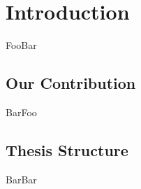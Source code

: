 
\chapter{Introduction}\label{c:introduction}
FooBar

\section{Our Contribution}\label{s:our-contribution}
BarFoo

\section{Thesis Structure}\label{s:thesis-structure}

BarBar
